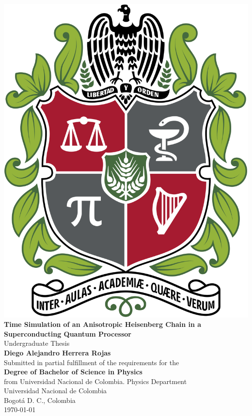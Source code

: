 \begin{titlepage}
  \begin{center}
    \vspace*{1cm}
    \includegraphics[scale=0.1]{Images/EscudoUnal.png}\\
    \vspace*{1cm}
    \huge
    \textbf{Time Simulation of an Anisotropic Heisenberg Chain in a Superconducting Quantum Processor}\\
    \vspace{0.5cm}
    \LARGE
    Undergraduate Thesis\\
    \vspace{1.5cm}
    \textbf{Diego Alejandro Herrera Rojas}\\
    \vfill
    \normalsize
    Submitted in partial fulfillment of the requirements for the\\
    \textbf{Degree of Bachelor of Science in Physics}\\
    from Universidad Nacional de Colombia.
    \vfill
    \large
    Physics Department\\
    Universidad Nacional de Colombia\\
    Bogotá D. C., Colombia\\
    \yeardate\today
  \end{center}
\end{titlepage}
